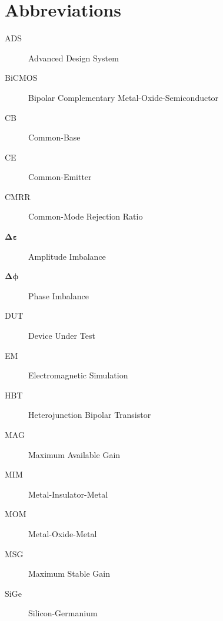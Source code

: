 \section*{Abbreviations}

\begin{description}

\item [ADS] Advanced Design System
\item [BiCMOS] Bipolar Complementary Metal-Oxide-Semiconductor
\item [CB] Common-Base
\item [CE] Common-Emitter
\item [CMRR] Common-Mode Rejection Ratio
\item [$\bm{\Delta \varepsilon}$] Amplitude Imbalance
\item [$\bm{\Delta \phi}$] Phase Imbalance
\item [DUT] Device Under Test
\item [EM] Electromagnetic Simulation
\item [HBT] Heterojunction Bipolar Transistor
\item [MAG] Maximum Available Gain
\item [MIM] Metal-Insulator-Metal
\item [MOM] Metal-Oxide-Metal
\item [MSG] Maximum Stable Gain
\item [SiGe] Silicon-Germanium


\end{description}

